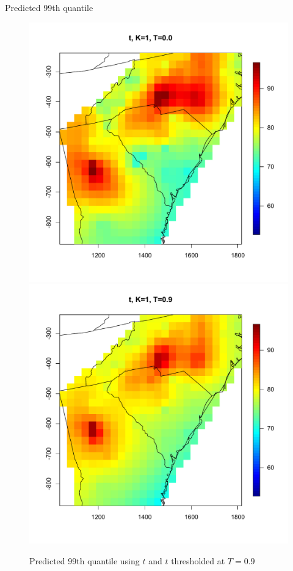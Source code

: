 \documentclass{beamer}
\begin{document}
\begin{frame}{Predicted 99th quantile}
\centering
\begin{figure}
    \includegraphics[width=.5\linewidth]{./plots/quantile-99-t10.pdf}
    \includegraphics[width=.5\linewidth]{./plots/quantile-99-t19.pdf}
    \caption{Predicted 99th quantile using $t$ and $t$ thresholded at $T=0.9$}
\end{figure}
\end{frame}
\end{document}
